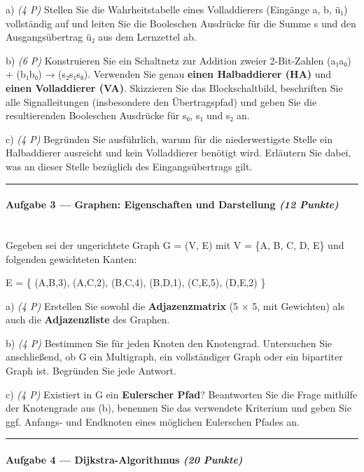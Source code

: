 \documentclass[11pt, a4paper]{article}
\begin{document}
a) \textit{(4 P)} Stellen Sie die Wahrheitstabelle eines Volladdierers (Eingänge a, b, ü₁) vollständig auf und leiten Sie die Booleschen Ausdrücke für die Summe s und den Ausgangsübertrag ü₂ aus dem Lernzettel ab.


b) \textit{(6 P)} Konstruieren Sie ein Schaltnetz zur Addition zweier 2-Bit-Zahlen (a₁a₀) + (b₁b₀) → (s₂s₁s₀). Verwenden Sie genau \textbf{einen Halbaddierer (HA)} und \textbf{einen Volladdierer (VA)}. Skizzieren Sie das Blockschaltbild, beschriften Sie alle Signalleitungen (insbesondere den Übertragspfad) und geben Sie die resultierenden Booleschen Ausdrücke für s₀, s₁ und s₂ an.


c) \textit{(4 P)} Begründen Sie ausführlich, warum für die niederwertigste Stelle ein Halbaddierer ausreicht und kein Volladdierer benötigt wird. Erläutern Sie dabei, was an dieser Stelle bezüglich des Eingangsübertrags gilt.



\noindent\textcolor{rulegray}{\rule{\linewidth}{0.4pt}}


\paragraph{Aufgabe 3 — Graphen: Eigenschaften und Darstellung \textit{(12 Punkte)}}\mbox{}\\[2pt]

Gegeben sei der ungerichtete Graph G = (V, E) mit V = \{A, B, C, D, E\} und folgenden gewichteten Kanten:


E = \{ (A,B,3), (A,C,2), (B,C,4), (B,D,1), (C,E,5), (D,E,2) \}


a) \textit{(4 P)} Erstellen Sie sowohl die \textbf{Adjazenzmatrix} (5 × 5, mit Gewichten) als auch die \textbf{Adjazenzliste} des Graphen.


b) \textit{(4 P)} Bestimmen Sie für jeden Knoten den Knotengrad. Untersuchen Sie anschließend, ob G ein Multigraph, ein vollständiger Graph oder ein bipartiter Graph ist. Begründen Sie jede Antwort.


c) \textit{(4 P)} Existiert in G ein \textbf{Eulerscher Pfad}? Beantworten Sie die Frage mithilfe der Knotengrade aus (b), benennen Sie das verwendete Kriterium und geben Sie ggf. Anfangs- und Endknoten eines möglichen Eulerschen Pfades an.



\noindent\textcolor{rulegray}{\rule{\linewidth}{0.4pt}}


\paragraph{Aufgabe 4 — Dijkstra-Algorithmus \textit{(20 Punkte)}}\mbox{}\\[2pt]
\end{document}
